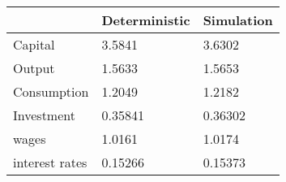 \begin{tabular}{lll}
& Deterministic & Simulation \\ 
\hline 
Capital & 3.5841 & 3.6302 \\ 
Output & 1.5633 & 1.5653 \\ 
Consumption & 1.2049 & 1.2182 \\ 
Investment & 0.35841 & 0.36302 \\ 
wages & 1.0161 & 1.0174 \\ 
interest rates & 0.15266 & 0.15373 \\ 
\hline 
\end{tabular}